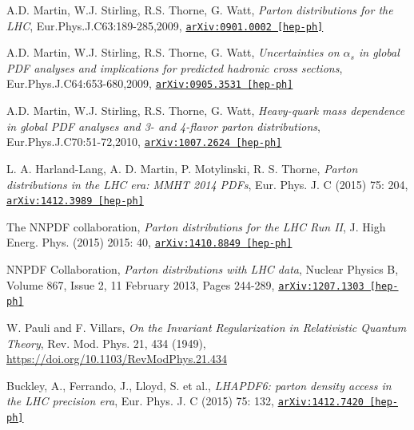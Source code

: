 \documentclass[11pt,a4paper,openright,twoside]{report}
\newcommand{\bibref}[4]{#1, \textit{#2}, #3 #4}
\begin{document}
\begin{thebibliography}{9}
	\bibref{A.D. Martin, W.J. Stirling, R.S. Thorne, G. Watt}{Parton distributions for the LHC}{Eur.Phys.J.C63:189-285,2009,}{\href{https://arxiv.org/abs/0901.0002}{\texttt{arXiv:0901.0002 [hep-ph]}}}
	
	\bibref{A.D. Martin, W.J. Stirling, R.S. Thorne, G. Watt}{Uncertainties on $\alpha_s$ in global PDF analyses and implications for predicted hadronic cross sections}{Eur.Phys.J.C64:653-680,2009,}{\href{https://arxiv.org/abs/0905.3531}{\texttt{arXiv:0905.3531 [hep-ph]}}}
	
	\bibref{A.D. Martin, W.J. Stirling, R.S. Thorne, G. Watt}{Heavy-quark mass dependence in global PDF analyses and 3- and 4-flavor parton distributions}{Eur.Phys.J.C70:51-72,2010,}{\href{https://arxiv.org/abs/1007.2624}{\texttt{arXiv:1007.2624 [hep-ph]}}}
	
	\bibref{L. A. Harland-Lang, A. D. Martin, P. Motylinski, R. S. Thorne}{Parton distributions in the LHC era: MMHT 2014 PDFs}{Eur. Phys. J. C (2015) 75: 204,}{\href{https://arxiv.org/abs/1412.3989}{\texttt{arXiv:1412.3989 [hep-ph]}}}
	
	\bibref{The NNPDF collaboration}{Parton distributions for the LHC Run II}{J. High Energ. Phys. (2015) 2015: 40,}{\href{https://arxiv.org/abs/1410.8849}{\texttt{arXiv:1410.8849 [hep-ph]}}}
	
	\bibref{NNPDF Collaboration}{Parton distributions with LHC data}{Nuclear Physics B, Volume 867, Issue 2, 11 February 2013, Pages 244-289,}{\href{https://arxiv.org/abs/1207.1303}{\texttt{arXiv:1207.1303 [hep-ph]}}}

	\bibref{W. Pauli and F. Villars}{On the Invariant Regularization in Relativistic Quantum Theory}{Rev. Mod. Phys. 21, 434 (1949),}{\url{https://doi.org/10.1103/RevModPhys.21.434}}
	
	\bibref{Buckley, A., Ferrando, J., Lloyd, S. et al.}{LHAPDF6: parton density access in the LHC precision era}{Eur. Phys. J. C (2015) 75: 132,}{\href{https://arxiv.org/abs/1412.7420}{\texttt{arXiv:1412.7420 [hep-ph]}}}


\end{thebibliography}
\end{document}
